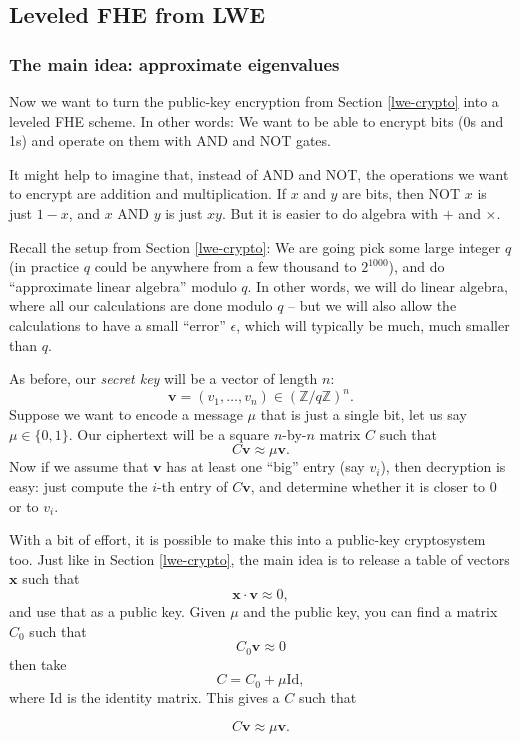 \subsection{Leveled FHE from LWE}\label{fhe}

\subsubsection{The main idea: approximate eigenvalues}

Now we want to turn the public-key encryption from Section \ref{lwe-crypto} into
a leveled FHE scheme. In other words: We want to be able to encrypt bits
(0s and 1s) and operate on them with AND and NOT gates.

It might help to imagine that, instead of AND and NOT, the operations we
want to encrypt are addition and multiplication. If \(x\) and \(y\) are
bits, then NOT \(x\) is just \(1 - x\), and \(x\) AND \(y\) is just
\(xy\). But it is easier to do algebra with \(+\) and \(\times\).

Recall the setup from Section \ref{lwe-crypto}: We are going pick some large
integer \(q\) (in practice \(q\) could be anywhere from a few thousand
to \(2^{1000}\)), and do ``approximate linear algebra'' modulo \(q\). In
other words, we will do linear algebra, where all our calculations are
done modulo \(q\) -- but we will also allow the calculations to have a
small ``error'' \(\epsilon\), which will typically be much, much smaller
than \(q\).

As before, our \emph{secret key} will be a vector of length \(n\):
\[\mathbf{v} = ( v_{1},\ldots,v_{n} ) \in ({\mathbb{Z}}/q{\mathbb{Z}})^{n}.\]
Suppose we want to encode a message \(\mu\) that is just a single bit,
let us say \(\mu \in \{ 0,1 \}\). Our ciphertext will be a
square \(n\)-by-\(n\) matrix \(C\) such that
\[C\mathbf{v} \approx \mu\mathbf{v}.\] Now if we assume that
\(\mathbf{v}\) has at least one ``big'' entry (say \(v_{i}\)), then
decryption is easy: just compute the \(i\)-th entry of \(C\mathbf{v}\),
and determine whether it is closer to \(0\) or to \(v_{i}\).

\begin{remark}
With a bit of effort, it is possible to make this into a public-key
cryptosystem too. Just like in Section \ref{lwe-crypto}, the main idea is to
release a table of vectors \(\mathbf{x}\) such that
\[\mathbf{x} \cdot \mathbf{v} \approx 0,\] and use that as a public key.
Given \(\mu\) and the public key, you can find a matrix \(C_{0}\) such
that \[C_{0}\mathbf{v} \approx 0\] then take
\[C = C_{0} + \mu\mathrm{Id},\] where \(\mathrm{Id}\) is
the identity matrix. This gives a \(C\) such that

\[C\mathbf{v} \approx \mu\mathbf{v}.\]
\end{remark}

